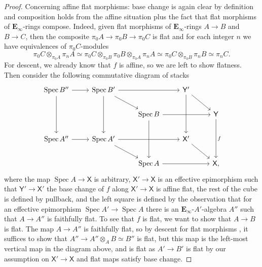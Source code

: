 \documentclass[11pt, a4paper]{article}
\DeclareMathOperator{\Spec}{Spec}
\newcommand{\1}{\mathbf{1}}
\newcommand{\E}{\mathbf{E}}
\newcommand{\X}{\mathsf{X}}
\newcommand{\Y}{\mathsf{Y}}
\theoremstyle{plain}
\theoremstyle{definition}
\theoremstyle{remark}\numberwithin{equation}{section}
\begin{document}
\begin{proof}
    Concerning affine flat morphisms: base change is again clear by definition and composition holds from the affine situation plus the fact that flat morphisms of $\E_\infty$-rings compose. Indeed, given flat morphisms of $\E_\infty$-rings $A \to B$ and $B \to C$, then the composite $\pi_0 A \to \pi_0 B \to \pi_0 C$ is flat and for each integer $n$ we have equivalences of $\pi_0 C$-modules
    \[\pi_0 C \otimes_{\pi_0 A} \pi_n A \simeq \pi_0 C \otimes_{\pi_0 B} \pi_0 B \otimes_{\pi_0 A} \pi_n A \simeq \pi_0 C \otimes_{\pi_0 B} \pi_n B \simeq \pi_n C.\]
    For descent, we already know that $f$ is affine, so we are left to show flatness. Then consider the following commutative diagram of stacks
    \begin{equation}\label{eq:reusable_cube}\begin{tikzcd}
        {\Spec B''}\ar[r]\ar[dd] &   {\Spec B'}\ar[rd]\ar[rr]\ar[dd]  &&  {\Y'}\ar[dd]\ar[rd]    &     \\
            &&   {\Spec B}\ar[rr]\ar[dd] &&   {\Y}\ar[dd, "f"]   \\
        {\Spec A''}\ar[r]       &   {\Spec A'}\ar[rd]\ar[rr]  &&  {\X'}\ar[rd]    &     \\
            &&   {\Spec A}\ar[rr] &&   {\X,}
    \end{tikzcd}\end{equation}
    where the map $\Spec A \to \X$ is arbitrary, $\X' \to \X$ is an effective epimorphism such that $\Y' \to \X'$ the base change of $f$ along $\X' \to \X$ is affine flat, the rest of the cube is defined by pullback, and the left square is defined by the observation \cite[Lm.A.13]{tokic_family_completion} that for an effective epimorphism $\Spec A' \to \Spec A$ there is an $\E_\infty$-$A'$-algebra $A''$ such that $A \to A''$ is faithfully flat. To see that $f$ is flat, we want to show that $A \to B$ is flat. The map $A \to A''$ is faithfully flat, so by descent for flat morphisms \cite[Pr.2.8.4.2(6)]{sag}, it suffices to show that $A'' \to A'' \otimes_A B \simeq B''$ is flat, but this map is the left-most vertical map in the diagram above, and is flat as $A' \to B'$ is flat by our assumption on $\X' \to \X$ and flat maps satisfy base change.


\end{proof}
\end{document}
